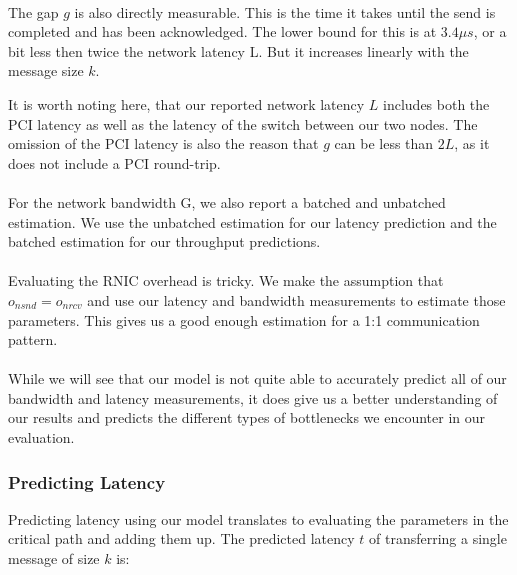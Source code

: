 \paragraph{} The gap $g$ is also directly measurable. This is the time it takes until the send is completed and has been
acknowledged. The lower bound for this is at $3.4\mu s$, or a bit less then twice the network latency L. But it increases
linearly with the message size $k$.

It is worth noting here, that our reported network latency $L$ includes both the PCI latency as well as the latency
of the switch between our two nodes. The omission of the PCI latency is also the reason that $g$ can be less than $2L$, 
as it does not include a PCI round-trip.

\paragraph{} For the network bandwidth G, we also report a batched and unbatched estimation. We use the unbatched estimation
for our latency prediction and the batched estimation for our throughput predictions.

\paragraph{} Evaluating the RNIC overhead is tricky. We make the assumption that $o_{nsnd} = o_{nrcv}$ and use our latency
and bandwidth measurements to estimate those parameters. This gives us a good enough estimation for a 1:1 communication pattern.





\paragraph{} While we will see that our model is not quite able to accurately predict all of our bandwidth and latency 
measurements, it does  give us a better understanding of our results and predicts the different types of bottlenecks 
we encounter in our evaluation.

\subsubsection{Predicting Latency}

Predicting latency using our model translates to evaluating the parameters in the critical path and adding them up. 
The predicted latency $t$ of transferring a single message of size $k$ is:

